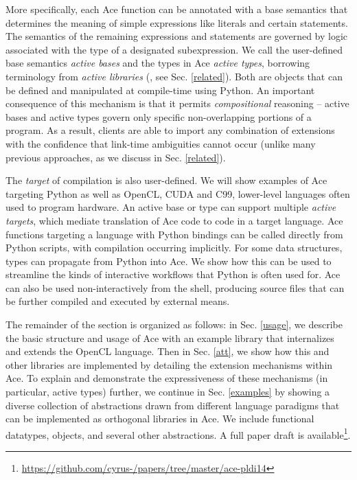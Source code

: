 More specifically, each Ace function can be annotated with a base semantics that determines the meaning of simple expressions like literals and certain statements. The semantics of the remaining expressions and statements are governed by logic associated with the type of a designated subexpression. We call the user-defined base semantics \emph{active bases} and the types in Ace \emph{active types}, borrowing terminology from \emph{active libraries} (\cite{activelibraries}, see Sec. \ref{related}). Both are objects that can be defined and manipulated at compile-time using Python. An important consequence of this mechanism is that it permits \emph{compositional} reasoning -- active bases and active types govern only specific non-overlapping portions of a program. As a result, clients are able to import any combination of extensions with the confidence that link-time ambiguities cannot occur (unlike many previous approaches, as we discuss in Sec. \ref{related}).

The \emph{target} of compilation is also user-defined. We will show examples of Ace targeting Python as well as OpenCL, CUDA and C99, lower-level languages often used to program hardware. An active base or type can support multiple \emph{active targets}, which mediate translation of Ace code to code in a target language. Ace functions targeting a language with Python bindings can be called directly from Python scripts, with compilation occurring implicitly. For some data structures, types can propagate from Python into Ace. We show how this can be used to streamline the kinds of interactive workflows that Python is often used for. Ace can also be used non-interactively from the shell, producing source files that can be further compiled and executed by external means.

The remainder of the section is organized as follows: in Sec. \ref{usage}, we describe the basic structure and usage of Ace with an example library that internalizes and extends the OpenCL language. Then in Sec. \ref{att}, we show how this and other libraries are implemented by detailing the extension mechanisms within Ace. To explain and demonstrate the expressiveness of these mechanisms (in particular, active types) further, we continue in Sec.  \ref{examples} by showing a diverse collection of abstractions drawn from different language paradigms that can be implemented as orthogonal libraries in Ace. We include functional datatypes, objects, and several other abstractions.  A full paper draft is available\footnote{\url{https://github.com/cyrus-/papers/tree/master/ace-pldi14}}.

